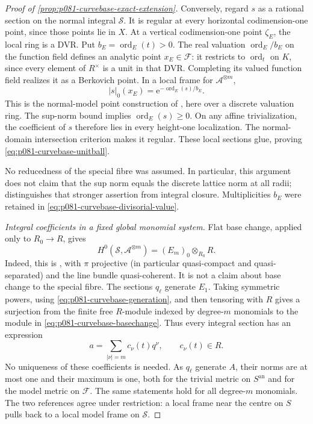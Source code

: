 \begin{proof}[Proof of \cref{prop:p081-curvebase-exact-extension}]
Conversely, regard \(s\) as a rational section on the normal integral
\(\mathscr S\). It is regular at every horizontal codimension-one point,
since those points lie in \(X\). At a vertical codimension-one point
\(\zeta_E\), the local ring is a DVR. Put
\(b_E=\operatorname{ord}_E(t)>0\).
The real valuation \(\operatorname{ord}_E/b_E\) on the function field
defines an analytic point \(x_E\in\mathcal F\): it restricts to
\(\operatorname{ord}_t\) on \(K\), since every element of \(R^\times\)
is a unit in that DVR. Completing its valued function field realizes
it as a Berkovich point. In a local frame for \(\mathscr A^{\otimes m}\),
\begin{equation}\label{eq:p081-curvebase-divisorial-value}
             |s|_0(x_E)
                =\mathrm e^{-\operatorname{ord}_E(s)/b_E}.
\end{equation}
This is the normal-model point construction of
\cite[Example~4.11]{BE2021}, here over a discrete valuation ring.
The sup-norm bound implies \(\operatorname{ord}_E(s)\geq0\).
On any affine trivialization, the coefficient of \(s\) therefore lies
in every height-one localization. The normal-domain intersection
criterion \cite[Tag 031T]{Stacks} makes it regular. These local
sections glue, proving \eqref{eq:p081-curvebase-unitball}.

No reducedness of the special fibre was assumed. In particular, this
argument does not claim that the sup norm equals the discrete lattice
norm at all radii; \cite[Theorem~4.19]{BE2021} distinguishes that stronger
assertion from integral closure. Multiplicities \(b_E\) were retained
in \eqref{eq:p081-curvebase-divisorial-value}.

\emph{Integral coefficients in a fixed global monomial system.}
Flat base change, applied only to \(R_0\to R\), gives
\begin{equation}\label{eq:p081-curvebase-basechange}
 H^0(\mathscr S,\mathscr A^{\otimes m})
       =(E_m)_0\otimes_{R_0}R .
\end{equation}
Indeed, this is \cite[Tag 02KH]{Stacks}, with \(\pi\) projective
(in particular quasi-compact and quasi-separated) and the line bundle
quasi-coherent. It is not a claim about base change to the special fibre.
The sections \(q_\ell\) generate \(E_1\). Taking symmetric powers,
using \eqref{eq:p081-curvebase-generation}, and then tensoring with \(R\)
gives a surjection from the finite free \(R\)-module indexed by
degree-\(m\) monomials to the module in
\eqref{eq:p081-curvebase-basechange}. Thus every integral section has
an expression
\begin{equation}\label{eq:p081-curvebase-coefficients}
          a=\sum_{|\nu|=m}c_\nu(t)q^\nu,\qquad c_\nu(t)\in R .
\end{equation}
No uniqueness of these coefficients is needed. As \(q_\ell\) generate
\(A\), their norms are at most one and their maximum is one, both for
the trivial metric on \(S^{\mathrm{an}}\) and for the model metric on
\(\mathcal F\). The same statements hold for all degree-\(m\) monomials.
The two references agree under restriction: a local frame near the
centre on \(S\) pulls back to a local model frame on \(\mathscr S\).


\end{proof}
